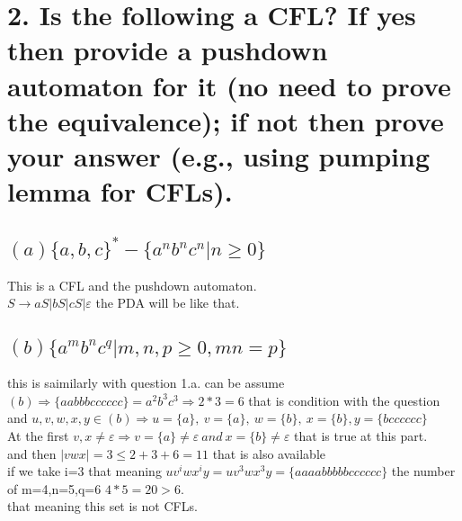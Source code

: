 \documentclass[12pt]{article}
\begin{document}
\newpage

\section*{2. Is the following a CFL? If yes then provide a pushdown automaton for it (no need to prove the equivalence); if not then prove your answer (e.g., using pumping lemma for CFLs).}
\subsection*{$\left(a\right)\{a,b,c\}^*-\{a^nb^nc^n|n\geq0\}$ }
This is a CFL and the pushdown automaton.\\
$ S\rightarrow aS|bS|cS|\varepsilon$
the PDA will be like that.\\
\begin{center}
\end{center} 


\subsection*{$\left(b\right) \{a^mb^nc^q|m,n,p\geq0,mn=p\} $}
this is saimilarly with question 1.a. can be assume $\left(b\right)\Rightarrow\{aabbbcccccc\}=a^2b^3c^3\Rightarrow2*3=6$ that is condition with the question 
 and $u,v,w,x,y\in \left(b\right)\Rightarrow u=\{a\},~v=\{a\},~w=\{b\},~x=\{b\},y=\{bcccccc\}$\\
 At the first $v,x\neq \varepsilon\Rightarrow v=\{a\}\neq\varepsilon~and~x=\{b\}\neq\varepsilon$ that is true at this part.\\
 and then $|vwx|=3\leq2+3+6=11$ that is also available \\
 if we take i=3 that meaning $uv^iwx^iy=uv^3wx^3y=\{a aaa b bbb bcccccc\}$ the number of m=4,n=5,q=6 $4*5=20>6$.\\
 that meaning this set is not CFLs.\\\
\end{document}
